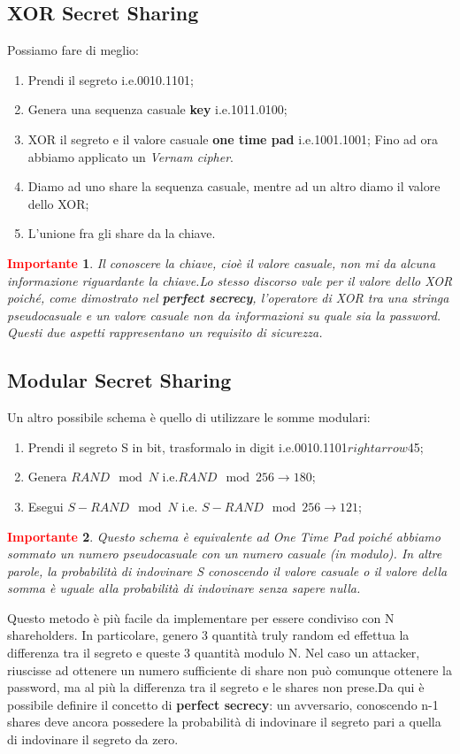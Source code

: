 \documentclass{book}
\newtheorem*{Importante}{\textbf{\textcolor{red}{Importante}}}
\begin{document}
\subsection{XOR Secret Sharing}
Possiamo fare di meglio:\begin{enumerate}
    \item Prendi il segreto i.e.0010.1101;
    \item Genera una sequenza casuale \textbf{key} i.e.1011.0100;
    \item XOR il segreto e il valore casuale \textbf{one time pad} i.e.1001.1001;\newline
          Fino ad ora abbiamo applicato un \emph{Vernam cipher}\@.
    \item Diamo ad uno share la sequenza casuale, mentre ad un altro diamo il valore dello XOR;\@
    \item L'unione fra gli share da la chiave\@.
\end{enumerate}
\begin{Importante}
    Il conoscere la chiave, cioè il valore casuale, non mi da alcuna informazione riguardante la chiave\@.\newline Lo stesso discorso vale per il valore dello XOR poiché, come dimostrato nel \textbf{perfect secrecy}, l'operatore di XOR tra una stringa pseudocasuale e un valore casuale non da informazioni su quale sia la password\@.\newline
    Questi due aspetti rappresentano un requisito di sicurezza\@.
\end{Importante}
\newpage
\subsection{Modular Secret Sharing}
Un altro possibile schema è quello di utilizzare le somme modulari:\begin{enumerate}
    \item Prendi il segreto S in bit, trasformalo in digit i.e.0010.1101\(rightarrow\)45;
    \item Genera \(RAND\mod{N}\) i.e.\(RAND\mod{256} \rightarrow  180\);
    \item Esegui \(S-RAND\mod{N}\) i.e. \(S-RAND\mod{256}\rightarrow  121\);
\end{enumerate}
\begin{Importante}
    Questo schema è equivalente ad One Time Pad poiché abbiamo sommato un numero pseudocasuale con un numero casuale (in modulo)\@. In altre parole, la probabilità di indovinare S conoscendo il valore casuale o il valore della somma è uguale alla probabilità di indovinare senza sapere nulla\@.
\end{Importante}
Questo metodo è più facile da implementare per essere condiviso con N shareholders\@. In particolare, genero 3 quantità truly random ed effettua la differenza tra il segreto e queste 3 quantità modulo N\@.
Nel caso un attacker, riuscisse ad ottenere un numero sufficiente di share non può comunque ottenere la password, ma al più la differenza tra il segreto e le shares non prese\@.\newline Da qui è possibile definire il concetto di \textbf{perfect secrecy}: un avversario, conoscendo n-1 shares deve ancora possedere la probabilità di indovinare il segreto pari a quella di indovinare il segreto da zero\@.
\end{document}
